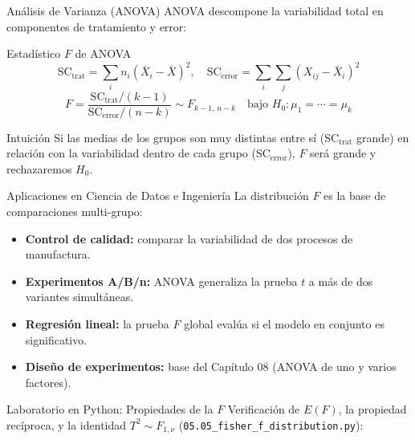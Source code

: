 \documentclass[10pt, aspectratio=169]{beamer}
\begin{document}
\begin{frame}{Análisis de Varianza (ANOVA)}
  \footnotesize
  ANOVA descompone la variabilidad total en componentes de tratamiento y error: \pause

  \vspace{0.1cm}
  \begin{block}{Estadístico $F$ de ANOVA}
    $$\text{SC}_{\text{trat}} = \sum_i n_i(\bar X_i-\bar X)^2, \quad \text{SC}_{\text{error}} = \sum_i\sum_j(X_{ij}-\bar X_i)^2$$
    $$F = \dfrac{\text{SC}_{\text{trat}}/(k-1)}{\text{SC}_{\text{error}}/(n-k)} \sim F_{k-1,\,n-k} \quad \text{bajo } H_0:\mu_1=\cdots=\mu_k$$
  \end{block}

  \vspace{0.1cm}
  \pause
  \begin{alertblock}{Intuición}
    Si las medias de los grupos son muy distintas entre sí (SC$_{\text{trat}}$ grande) en relación con la variabilidad dentro de cada grupo (SC$_{\text{error}}$), $F$ será grande y rechazaremos $H_0$.
  \end{alertblock}
\end{frame}

\begin{frame}{Aplicaciones en Ciencia de Datos e Ingeniería}
  \footnotesize
  La distribución $F$ es la base de comparaciones multi-grupo: \pause

  \vspace{0.15cm}
  \begin{itemize}\itemsep=0.12cm
    \item \textbf{Control de calidad:} comparar la variabilidad de dos procesos de manufactura. \pause
    \item \textbf{Experimentos A/B/n:} ANOVA generaliza la prueba $t$ a más de dos variantes simultáneas. \pause
    \item \textbf{Regresión lineal:} la prueba $F$ global evalúa si el modelo en conjunto es significativo. \pause
    \item \textbf{Diseño de experimentos:} base del Capítulo 08 (ANOVA de uno y varios factores).
  \end{itemize}
\end{frame}

\begin{frame}[fragile]{Laboratorio en Python: Propiedades de la $F$}
  \scriptsize
  Verificación de $E(F)$, la propiedad recíproca, y la identidad $T^2\sim F_{1,\nu}$ (\texttt{05.05\_fisher\_f\_distribution.py}):
  {
  }
\end{frame}
\end{document}
